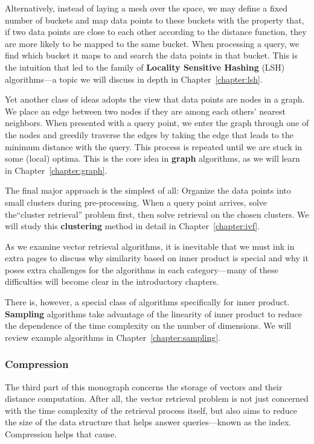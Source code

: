 Alternatively, instead of laying a mesh over the space, we may define a fixed
number of buckets and map data points to these buckets with the property that,
if two data points are close to each other according to the distance function,
they are more likely to be mapped to the same bucket. When processing a query,
we find which bucket it maps to and search the data points in that bucket.
This is the intuition that led to the family of \textbf{Locality Sensitive Hashing} (LSH)
algorithms---a topic we will discuss in depth in Chapter~\ref{chapter:lsh}.

Yet another class of ideas adopts the view that data points are nodes in a graph.
We place an edge between two nodes if they are among each others' nearest neighbors.
When presented with a query point, we enter the graph through one of the nodes
and greedily traverse the edges by taking the edge that leads to the minimum distance
with the query. This process is repeated until we are stuck in some (local) optima.
This is the core idea in \textbf{graph} algorithms, as we will learn in Chapter~\ref{chapter:graph}.

The final major approach is the simplest of all: Organize the data points into small clusters during
pre-processing. When a query point arrives, solve the``cluster retrieval'' problem first, then
solve retrieval on the chosen clusters.
We will study this \textbf{clustering} method in detail in
Chapter~\ref{chapter:ivf}.

As we examine vector retrieval algorithms, it is inevitable that we must
ink in extra pages to discuss why similarity based on inner product is special
and why it poses extra challenges for the algorithms in each
category---many of these difficulties
will become clear in the introductory chapters.

There is, however, a special class of algorithms specifically for inner product.
\textbf{Sampling} algorithms take advantage of the linearity of inner product to
reduce the dependence of the time complexity on the number of dimensions.
We will review example algorithms in Chapter~\ref{chapter:sampling}.

\subsubsection*{Compression}

The third part of this monograph concerns the storage of vectors and their distance computation.
After all, the vector retrieval problem is not just concerned with
the time complexity of the retrieval process itself, but also aims to reduce the
size of the data structure that helps answer queries---known as the index.
Compression helps that cause.

